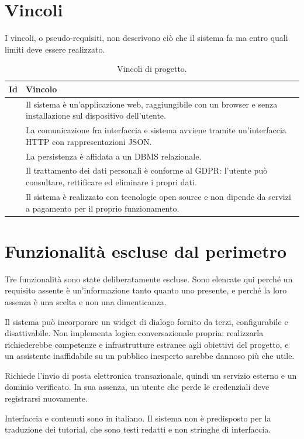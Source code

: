 \section{Vincoli}
\label{sec:rad-vincoli}

I vincoli, o pseudo-requisiti, non descrivono ciò che il sistema fa ma entro
quali limiti deve essere realizzato.

\begin{table}[H]
\centering
\begin{tabular}{@{}l L{12.2cm}@{}}
\toprule
\textbf{Id} & \textbf{Vincolo} \\
\midrule
{} & Il sistema è un'applicazione web, raggiungibile con un browser e
            senza installazione sul dispositivo dell'utente. \\
 & La comunicazione fra interfaccia e sistema avviene tramite
            un'interfaccia HTTP con rappresentazioni JSON. \\
 & La persistenza è affidata a un DBMS relazionale. \\
 & Il trattamento dei dati personali è conforme al GDPR: l'utente
            può consultare, rettificare ed eliminare i propri dati. \\
 & Il sistema è realizzato con tecnologie open source e non dipende
            da servizi a pagamento per il proprio funzionamento. \\
\bottomrule
\end{tabular}
\caption{Vincoli di progetto.}
\label{tab:rad-vincoli}
\end{table}

\section{Funzionalità escluse dal perimetro}
\label{sec:rad-fuori-perimetro}

Tre funzionalità sono state deliberatamente escluse. Sono elencate qui perché
un requisito assente è un'informazione tanto quanto uno presente, e perché la
loro assenza è una scelta e non una dimenticanza.

\begin{description}[leftmargin=1.2cm,style=nextline]
  \item[Assistente conversazionale] Il sistema può incorporare un widget di
    dialogo fornito da terzi, configurabile e disattivabile. Non implementa
    logica conversazionale propria: realizzarla richiederebbe competenze e
    infrastrutture estranee agli obiettivi del progetto, e un assistente
    inaffidabile su un pubblico inesperto sarebbe dannoso più che utile.
  \item[Recupero della password] Richiede l'invio di posta elettronica
    transazionale, quindi un servizio esterno e un dominio verificato. In sua
    assenza, un utente che perde le credenziali deve registrarsi nuovamente.
  \item[Supporto multilingua] Interfaccia e contenuti sono in italiano. Il
    sistema non è predisposto per la traduzione dei tutorial, che sono testi
    redatti e non stringhe di interfaccia.
\end{description}

